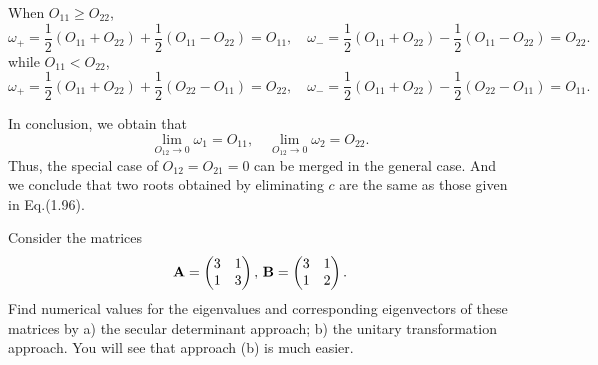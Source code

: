 \documentclass[a4paper]{book}
\newcounter{exercise}[chapter]
\newcounter{solution}[chapter]
\newcommand{\A}{{\bf A}}
\newcommand{\B}{{\bf B}}
\begin{document}
\begin{solution}
	When $O_{11} \ge O_{22}$,
	\[
		\omega_+ = \frac{1}{2} \left( O_{11} + O_{22} \right) + \frac{1}{2} \left( O_{11} - O_{22} \right) = O_{11} , \quad \omega_- = \frac{1}{2} \left( O_{11} + O_{22} \right) - \frac{1}{2} \left( O_{11} - O_{22} \right) = O_{22} .
	\]	
	while $O_{11} < O_{22}$,
	\[
		\omega_+ = \frac{1}{2} \left( O_{11} + O_{22} \right) + \frac{1}{2} \left( O_{22} - O_{11} \right) = O_{22} , \quad \omega_- = \frac{1}{2} \left( O_{11} + O_{22} \right) - \frac{1}{2} \left( O_{22} - O_{11} \right) = O_{11} .
	\]	
	
	In conclusion, we obtain that
	\[
		\lim_{O_{12} \rightarrow 0} \omega_1 = O_{11} , \quad \lim_{O_{12} \rightarrow 0} \omega_2 = O_{22} .
	\]
	Thus, the special case of $O_{12} = O_{21} = 0$ can be merged in the general case. And we conclude that two roots obtained by eliminating $c$ are the same as those given in Eq.(1.96).
	
	\end{solution}
	
	\begin{exercise}
	Consider the matrices
	\begin{equation*}
		\A = \begin{pmatrix} 3 & 1 \\ 1 & 3 \end{pmatrix}, \,  \B = \begin{pmatrix} 3 & 1 \\ 1 & 2 \end{pmatrix}.
	\end{equation*}
	Find numerical values for the eigenvalues and corresponding eigenvectors of these matrices by a) the secular determinant approach; b) the unitary transformation approach. You will see that approach (b) is much easier.
	\end{exercise}
	
\end{document}
